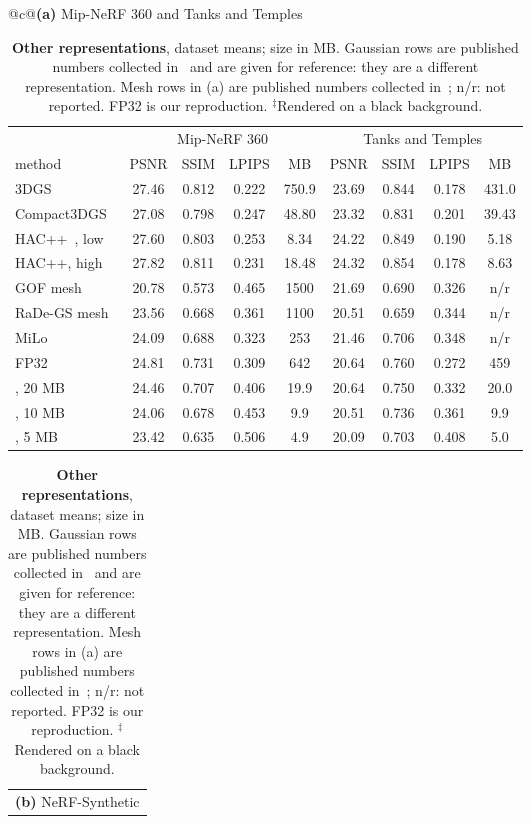 \begin{table}[t]\centering\footnotesize
\caption{\textbf{Other representations}, dataset means; size in MB. Gaussian rows are published numbers collected in~\cite{hacpp2025} and are given for reference: they are a different representation. Mesh rows in (a) are published numbers collected in~\cite{meshsplatting2025}; n/r: not reported. \MS FP32 is our reproduction. $^\ddagger$Rendered on a black background.}
\label{tab:cross}
\setlength{\tabcolsep}{2.6pt}
\begin{tabular}[t]{@{}c@{}}\textbf{(a)} Mip-NeRF 360 and Tanks and Temples\\[2pt]
\begin{tabular}[t]{@{}lcccccccc@{}}
\toprule
 & \multicolumn{4}{c}{Mip-NeRF 360} & \multicolumn{4}{c}{Tanks and Temples} \\
\cmidrule(lr){2-5}\cmidrule(lr){6-9}
method & PSNR & SSIM & LPIPS & MB & PSNR & SSIM & LPIPS & MB \\
\midrule
3DGS~\cite{kerbl2023gaussians} & 27.46 & 0.812 & 0.222 & 750.9 & 23.69 & 0.844 & 0.178 & 431.0 \\
Compact3DGS~\cite{compact3dgs2024} & 27.08 & 0.798 & 0.247 & 48.80 & 23.32 & 0.831 & 0.201 & 39.43 \\
HAC++~\cite{hacpp2025}, low & 27.60 & 0.803 & 0.253 & 8.34 & 24.22 & 0.849 & 0.190 & 5.18 \\
HAC++, high & 27.82 & 0.811 & 0.231 & 18.48 & 24.32 & 0.854 & 0.178 & 8.63 \\
\midrule
GOF mesh~\cite{gof2024} & 20.78 & 0.573 & 0.465 & 1500 & 21.69 & 0.690 & 0.326 & n/r \\
RaDe-GS mesh~\cite{rade2024} & 23.56 & 0.668 & 0.361 & 1100 & 20.51 & 0.659 & 0.344 & n/r \\
MiLo~\cite{milo2025} & 24.09 & 0.688 & 0.323 & 253 & 21.46 & 0.706 & 0.348 & n/r \\
\MS FP32~\cite{meshsplatting2025} & 24.81 & 0.731 & 0.309 & 642 & 20.64 & 0.760 & 0.272 & 459 \\
\midrule
\BM, 20 MB & 24.46 & 0.707 & 0.406 & 19.9 & 20.64 & 0.750 & 0.332 & 20.0 \\
\BM, 10 MB & 24.06 & 0.678 & 0.453 & 9.9 & 20.51 & 0.736 & 0.361 & 9.9 \\
\BM, 5 MB & 23.42 & 0.635 & 0.506 & 4.9 & 20.09 & 0.703 & 0.408 & 5.0 \\
\bottomrule
\end{tabular}
\end{tabular}\hfill
\begin{tabular}[t]{@{}c@{}}\textbf{(b)} NeRF-Synthetic\\[2pt]

\end{tabular}
\end{table}
